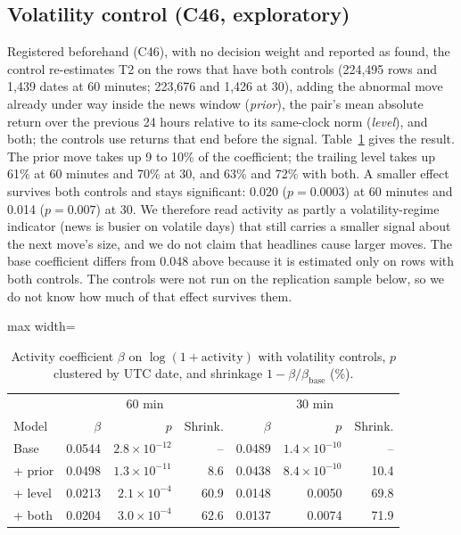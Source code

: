 \documentclass[conference]{IEEEtran}
\begin{document}
\subsection{Volatility control (C46, exploratory)}
Registered beforehand (C46), with no decision weight and reported as found, the control
re-estimates T2 on the rows that have both controls (224,495 rows and 1,439 dates at 60
minutes; 223,676 and 1,426 at 30), adding the abnormal move already under way inside the news
window (\emph{prior}), the pair's mean absolute return over the previous 24 hours relative to its
same-clock norm (\emph{level}), and both; the controls use returns that end before the signal.
Table~\ref{tab:volctl} gives the result. The prior move takes up 9 to 10\% of the coefficient;
the trailing level takes up 61\% at 60 minutes and 70\% at 30, and 63\% and 72\% with both. A
smaller effect survives both controls and stays significant: 0.020 ($p=0.0003$) at 60 minutes and
0.014 ($p=0.007$) at 30. We therefore read activity as partly a volatility-regime indicator (news
is busier on volatile days) that still carries a smaller signal about the next move's size, and we
do not claim that headlines cause larger moves. The base coefficient differs from 0.048 above
because it is estimated only on rows with both controls. The controls were not run on the
replication sample below, so we do not know how much of that effect survives them.

\begin{table}[t]\centering\footnotesize
\caption{Activity coefficient $\beta$ on $\log(1+\text{activity})$ with volatility controls,
$p$ clustered by UTC date, and shrinkage $1-\beta/\beta_{\text{base}}$ (\%).}\label{tab:volctl}
\begin{adjustbox}{max width=\columnwidth}
\begin{tabular}{@{}lrrrrrr@{}}
\toprule
 & \multicolumn{3}{c}{60 min} & \multicolumn{3}{c}{30 min}\\
Model & $\beta$ & $p$ & Shrink. & $\beta$ & $p$ & Shrink.\\
\midrule
Base & 0.0544 & $2.8\times10^{-12}$ & -- & 0.0489 & $1.4\times10^{-10}$ & --\\
+ prior & 0.0498 & $1.3\times10^{-11}$ & 8.6 & 0.0438 & $8.4\times10^{-10}$ & 10.4\\
+ level & 0.0213 & $2.1\times10^{-4}$ & 60.9 & 0.0148 & 0.0050 & 69.8\\
+ both & 0.0204 & $3.0\times10^{-4}$ & 62.6 & 0.0137 & 0.0074 & 71.9\\
\bottomrule
\end{tabular}
\end{adjustbox}
\end{table}
\end{document}
